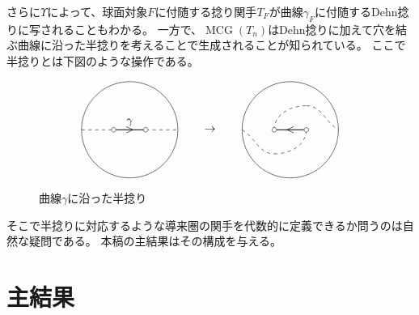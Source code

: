 \documentclass[uplatex,11pt,a4paper,dvipdfmx]{jsarticle}
\numberwithin{equation}{section}
\theoremstyle{definition}
\DeclareMathOperator{\MCG}{\mathrm{MCG}}
\begin{document}
さらに$\Upsilon$によって、球面対象$F$に付随する捻り関手$T_F$が曲線$\gamma_F$に付随するDehn捻りに写されることもわかる。
一方で、$\MCG(T_n)$はDehn捻りに加えて穴を結ぶ曲線に沿った半捻りを考えることで生成されることが知られている。
ここで半捻りとは下図のような操作である。

\begin{figure}[h]\label{fig:half_twist}
    \begin{displaymath}
        \begin{tikzpicture}
            \draw (0, 1.5) circle[radius=1.5];
            \draw[thick] (-0.5, 1.5)--(0.5, 1.5);
            \draw(0, 1.5) node{$>$};
            \draw[dashed] (-1.5, 1.5)--(-0.5, 1.5);
            \draw[dashed] (0.5, 1.5)--(1.5, 1.5);

            \foreach \u in {-0.5, 0.5}
                {
                    \filldraw[white] (\u, 1.5) circle (2pt);
                    \draw[black] (\u, 1.5) circle (2pt);
                }
            \draw(0, 1.5) node[above]{$\gamma$};

            \draw(2.5, 1.5) node{$\rightarrow$};

            \draw (0+5, 1.5) circle[radius=1.5];
            \draw[thick] (-0.5+5, 1.5)--(0.5+5, 1.5);
            \draw(5, 1.5) node{$<$};


            \draw[dashed](-1.5+5, 1.5) to[out=-30,in=180](-0.5+5, 0.75);
            \draw[dashed](-0.5+5, 0.75) to[out=0,in=-90](0.5+5, 1.5);

            \draw[dashed](-0.5+5, 1.5) to[out=90,in=180](0.5+5, 2.25);
            \draw[dashed](0.5+5, 2.25) to[out=0,in=150](1.5+5, 1.5);


            \foreach \u in {-0.5, 0.5}
                {
                    \filldraw[white] (\u+5, 1.5) circle (2pt);
                    \draw[black] (\u+5, 1.5) circle (2pt);
                }
        \end{tikzpicture}
    \end{displaymath}
    \caption{曲線$\gamma$に沿った半捻り}
\end{figure}
そこで半捻りに対応するような導来圏の関手を代数的に定義できるか問うのは自然な疑問である。
本稿の主結果はその構成を与える。
\section{主結果}
\end{document}
